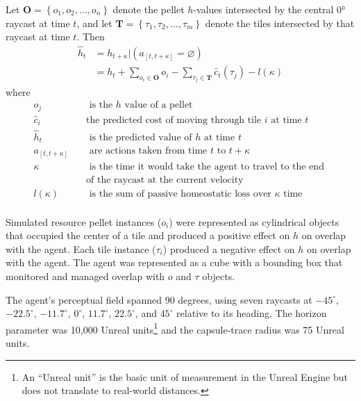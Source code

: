 \documentclass[12pt,fleqn]{article}
\begin{document}
Let \(\mathbf{O} = \left\{ o_1,o_2,\ldots,o_{n} \right\}\) denote the pellet \(h\)-values intersected by the central 0° raycast at time \(t\), and let \(\mathbf{T} = \left\{\tau_1,\tau_2,\ldots,\tau_{m}\right\}\) denote the tiles intersected by that raycast at time \(t\). Then
\begin{equation}
  \begin{aligned}
    \hat{h}_t & = h_{t+\kappa}|(a_{[t, t+\kappa]}= \varnothing)                                                        \\
              & = h_t + \sum_{o_i \in \mathbf{O}} o_{i} - \sum_{\tau_j \in \mathbf{T}} \hat{c}_{t}(\tau_j) - l(\kappa)
  \end{aligned}
\end{equation}
where
\begin{align*}
  o_{j}             & \quad\text{ is the }h \text{ value of a pellet}                               \\
  \hat{c}_{i}       & \quad\text{the predicted cost of moving through tile }i\text{ at time }t      \\
  \hat{h}_t         & \quad\text{ is the predicted value of } h\text{ at time } t                   \\
  a_{[t, t+\kappa]} & \quad\text{ are actions taken from time } t\text{ to } t+\kappa               \\
  \kappa            & \quad\text{ is the time it would take the agent to travel to the end }        \\
                    & \quad\text{of the raycast at the current velocity}                            \\
  l(\kappa)         & \quad\text{ is the sum of passive homeostatic loss over } \kappa \text{ time} \\
\end{align*}

Simulated resource pellet instances (\(o_i\)) were represented as cylindrical objects that occupied the center of a tile and produced a positive effect on \(h\) on overlap with the agent. Each tile instance (\(\tau_i\)) produced a negative effect on \(h\) on overlap with the agent. The agent was represented as a cube with a bounding box that monitored and managed overlap with \(o\) and \(\tau\) objects.

The agent's perceptual field spanned 90 degrees, using seven raycasts at $-45^\circ$, $-22.5^\circ$, $-11.7^\circ$, $0^\circ$, $11.7^\circ$, $22.5^\circ$, and $45^\circ$ relative to its heading. The horizon parameter was 10,000 Unreal units\footnote{An ``Unreal unit'' is the basic unit of measurement in the Unreal Engine but does not translate to real-world distances.} and the capsule-trace radius was 75 Unreal units.
\end{document}
